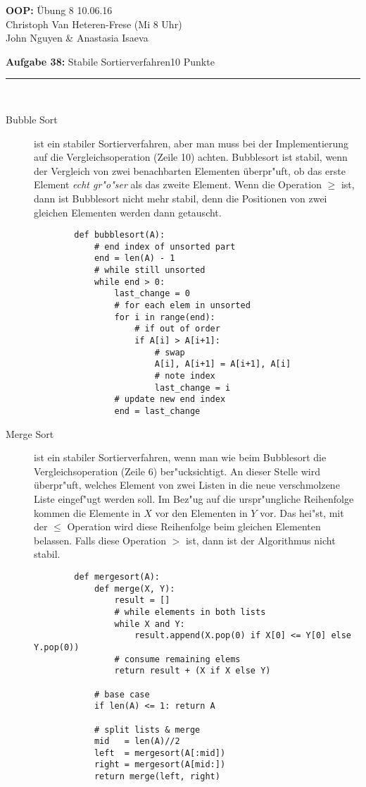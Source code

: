 \documentclass[a4paper, 12pt]{article}
\newcommand{\TITLE}[3]{\Large\textbf{#1:} \"Ubung #2 \hfill #3\\[3pt]}
\newcommand{\TUTOR}[3]{\normalsize{#1 (#2 #3 Uhr)}}
\newcommand{\AUTHOR}{\normalsize{John Nguyen \& Anastasia Isaeva}}
\newcommand{\AUFGABE}[3]{
\vspace{1.5cm}
\noindent\large\textbf{Aufgabe #1: }{#2}\hfill\small#3 Punkte\\[-5pt]
\rule{\textwidth}{0.4pt}\\}
\begin{document}
\noindent\TITLE{OOP}{8}{10.06.16}
\TUTOR{Christoph Van Heteren-Frese}{Mi}{8}\\
\AUTHOR

\AUFGABE{38}{Stabile Sortierverfahren}{10}

\begin{description}
	\item[Bubble Sort]
	ist ein stabiler Sortierverfahren, aber man muss bei der Implementierung auf die Vergleichsoperation (Zeile 10) achten. Bubblesort ist stabil, wenn der Vergleich von zwei benachbarten Elementen \"uberpr"uft, ob das erste Element \emph{echt gr"o"ser} als das zweite Element. Wenn die Operation $\ge$ ist, dann ist Bubblesort nicht mehr stabil, denn die Positionen von zwei gleichen Elementen werden dann getauscht.

	\begin{lstlisting}
		def bubblesort(A):
			# end index of unsorted part
			end = len(A) - 1
			# while still unsorted
			while end > 0:
				last_change = 0
				# for each elem in unsorted
				for i in range(end):
					# if out of order
					if A[i] > A[i+1]:
						# swap
						A[i], A[i+1] = A[i+1], A[i]
						# note index
						last_change = i
				# update new end index
				end = last_change
	\end{lstlisting}

	\item[Merge Sort]
	ist ein stabiler Sortierverfahren, wenn man wie beim Bubblesort die Vergleichsoperation (Zeile 6) ber"ucksichtigt. An dieser Stelle wird \"uberpr"uft, welches Element von zwei Listen in die neue verschmolzene Liste eingef"ugt werden soll. Im Bez"ug auf die urspr"ungliche Reihenfolge kommen die Elemente in $X$ vor den Elementen in $Y$ vor. Das hei"st, mit der $\le$ Operation wird diese Reihenfolge beim gleichen Elementen belassen. Falls diese Operation $>$ ist, dann ist der Algorithmus nicht stabil.

	\begin{lstlisting}
		def mergesort(A):
			def merge(X, Y):
				result = []
				# while elements in both lists
				while X and Y:
					result.append(X.pop(0) if X[0] <= Y[0] else Y.pop(0))
				# consume remaining elems
				return result + (X if X else Y)

			# base case
			if len(A) <= 1: return A

			# split lists & merge
			mid   = len(A)//2
			left  = mergesort(A[:mid])
			right = mergesort(A[mid:])
			return merge(left, right)
	\end{lstlisting}


\end{description}
\end{document}
